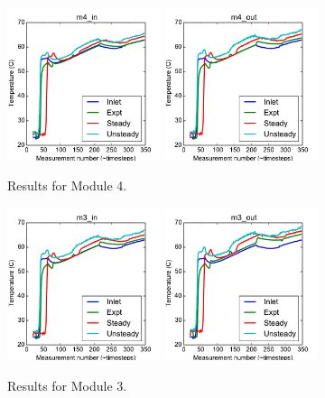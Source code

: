 \documentclass{article}
\begin{document}
\clearpage
\begin{figure}[!ht]
\centering
\includegraphics[width=0.4\textwidth]{../../data/ICSolar/images/Feb6_m4_in_compare.pdf}\hspace{0.05\textwidth}
\includegraphics[width=0.4\textwidth]{../../data/ICSolar/images/Feb6_m4_out_compare.pdf}\hspace{0.05\textwidth}\\
\caption{Results for Module 4.}\end{figure}
\begin{figure}[!ht]
\centering
\includegraphics[width=0.4\textwidth]{../../data/ICSolar/images/Feb6_m3_in_compare.pdf}\hspace{0.05\textwidth}
\includegraphics[width=0.4\textwidth]{../../data/ICSolar/images/Feb6_m3_out_compare.pdf}\hspace{0.05\textwidth}\\
\caption{Results for Module 3.}\end{figure}
\end{document}
